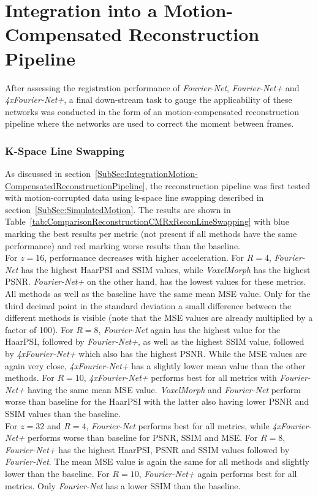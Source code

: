 \section{Integration into a Motion-Compensated Reconstruction Pipeline} \label{Sec:ResultsIntegrationMotion-CompensatedReconstructionPipeline}
After assessing the registration performance of \emph{Fourier-Net}, \emph{Fourier-Net+} and \emph{4xFourier-Net+}, a final down-stream task to gauge the applicability of these networks was conducted in the form of an motion-compensated reconstruction pipeline where the networks are used to correct the moment between frames.

\subsubsection{K-Space Line Swapping} \label{SubSubSec:ResultsK-SpaceLineSwapping}
As discussed in section~\ref{SubSec:IntegrationMotion-CompensatedReconstructionPipeline}, the reconstruction pipeline was first tested with motion-corrupted data using k-space line swapping described in section~\ref{SubSec:SimulatedMotion}. The results are shown in Table~\ref{tab:ComparisonReconstructionCMRxReconLineSwapping} with blue marking the best results per metric (not present if all methods have the same performance) and red marking worse results than the baseline. \\
For $z=16$, performance decreases with higher acceleration. For $R=4$, \emph{Fourier-Net} has the highest HaarPSI and SSIM values, while \emph{VoxelMorph} has the highest PSNR. \emph{Fourier-Net+} on the other hand, has the lowest values for these metrics. All methods as well as the baseline have the same mean MSE value. Only for the third decimal point in the standard deviation a small difference between the different methods is visible (note that the MSE values are already multiplied by a factor of 100). %
For $R=8$, \emph{Fourier-Net} again has the highest value for the HaarPSI, followed by \emph{Fourier-Net+}, as well as the highest SSIM value, followed by \emph{4xFourier-Net+} which also has the highest PSNR. While the MSE values are again very close, \emph{4xFourier-Net+} has a slightly lower mean value than the other methods.%
For $R=10$, \emph{4xFourier-Net+} performs best for all metrics with \emph{Fourier-Net+} having the same mean MSE value. \emph{VoxelMorph} and \emph{Fourier-Net} perform worse than baseline for the HaarPSI with the latter also having lower PSNR and SSIM values than the baseline.\\
For $z=32$ and $R=4$, \emph{Fourier-Net} performs best for all metrics, while \emph{4xFourier-Net+} performs worse than baseline for PSNR, SSIM and MSE. For $R=8$, \emph{Fourier-Net+} has the highest HaarPSI, PSNR and SSIM values followed by \emph{Fourier-Net}. The mean MSE value is again the same for all methods and slightly lower than the baseline. For $R=10$, \emph{Fourier-Net+} again performs best for all metrics. Only \emph{Fourier-Net} has a lower SSIM than the baseline.

